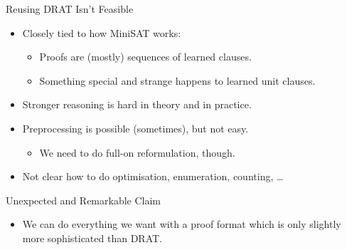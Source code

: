 \documentclass{beamer}
\begin{document}
\begin{frame}{Reusing DRAT Isn't Feasible}
    \begin{itemize}
        \item Closely tied to how MiniSAT works:
            \begin{itemize}
                \item Proofs are (mostly) sequences of learned clauses.
                \item Something special and strange happens to learned unit clauses.
            \end{itemize}
        \item Stronger reasoning is hard in theory and in practice.
        \item Preprocessing is possible (sometimes), but not easy.
            \begin{itemize}
                \item We need to do full-on reformulation, though.
            \end{itemize}
        \item Not clear how to do optimisation, enumeration, counting, \ldots
    \end{itemize}
\end{frame}

\begin{frame}{Unexpected and Remarkable Claim}
    \begin{itemize}
        \item We can do everything we want with a proof format which is only slightly more
            sophisticated than DRAT.
    \end{itemize}
\end{frame}
\end{document}
